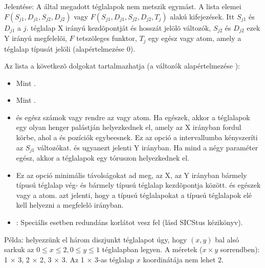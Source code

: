 {}

     Jelentése: A  által megadott téglalapok nem metszik
     egymást. A  lista elemei $F(S_{j1},D_{j1},S_{j2},D_{j2})$
     vagy $F(S_{j1},D_{j1},S_{j2},D_{j2},T_j)$ alakú kifejezések. Itt
     $S_{j1}$ és $D_{j1}$ a $j$. téglalap X irányú kezdõpontját és hosszát
     jelölõ változók, $S_{j2}$ és $D_{j2}$ ezek Y irányú megfelelõi,
     $F$ tetszõleges funktor,  $T_j$ egy egész vagy atom, amely a
     téglalap típusát jelöli (alapértelmezése 0).

Az  lista a következõ dolgokat tartalmazhatja (a  változók
alapértelmezése ):

\begin{itemize}
\item {}
          Mint .

\item {}
          Mint .

\item {}
           és  egész számok vagy rendre az  vagy
           atom. Ha egészek, akkor a téglalapok egy olyan henger
          palástján helyezkednek el, amely az X irányban fordul körbe, ahol
          a  és  pozíciók egybeesnek. Ez az opció a
           intervallumba kényszeríti az $S_{j1}$ változókat.
           és  ugyanezt jelenti Y irányban. Ha mind a négy
          paraméter egész, akkor a téglalapok egy tóruszon helyezkednek el.

\item {}
          Ez az opció minimális távolságokat ad meg,  az X,
           az Y irányban bármely  típusú téglalap vég- és bármely 
          típusú téglalap kezdõpontja között.  és  egészek vagy a
           atom.  azt jelenti, hogy a  típusú téglalapokat
          a  típusú téglalapok elé kell helyezni a megfelelõ irányban.

\item {}:  Speciális esetben redundáns korlátot
          vesz fel (lásd SICStus kézikönyv).
\end{itemize}

Példa: helyezzünk el három diszjunkt téglalapot úgy, hogy $(x,y)$ bal alsó sarkuk
az $0 \leq x \leq 2, 0 \leq y \leq 1$ téglalapban legyen. A méretek ($x \times y$
sorrendben): 1 $\times$ 3, 2 $\times$ 2, 3 $\times$ 3. Az 1 $\times$ 3-as téglalap
$x$ koordinátája nem lehet 2.

